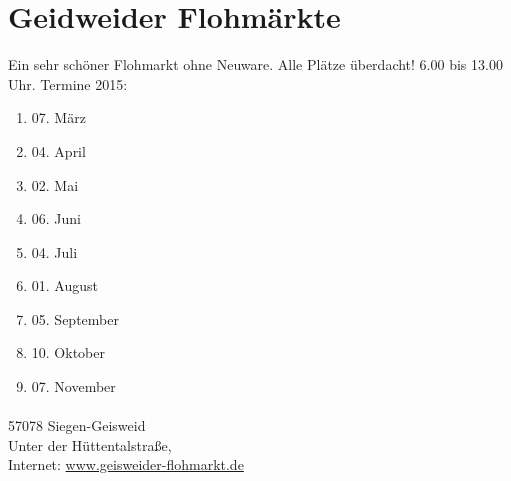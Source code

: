 \section{Geidweider Flohmärkte}
Ein sehr schöner Flohmarkt ohne Neuware. Alle Plätze überdacht! 6.00 bis 13.00 Uhr. Termine 2015:\\
\begin{enumerate}
	\item 07. März
	\item 04. April
	\item 02. Mai
	\item 06. Juni
	\item 04. Juli 
	\item 01. August
	\item 05. September
	\item 10. Oktober
	\item 07. November
\end{enumerate}

\paragraph{}57078 Siegen-Geisweid\\
Unter der Hüttentalstraße,\\
Internet: \href{http://www.geisweider-flohmarkt.de}{www.geisweider-flohmarkt.de}
 
